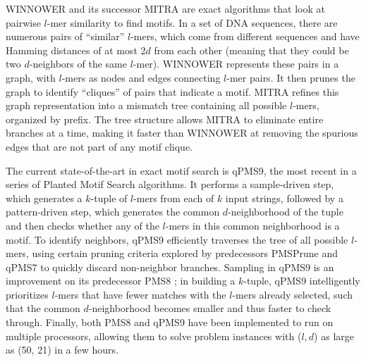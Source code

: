 \documentclass[oneside,12pt]{DISCSthesis}
\begin{document}
		WINNOWER \cite{pevzner2000combinatorial} and its successor MITRA \cite{eskin2002finding} are exact algorithms that look at pairwise $l$-mer similarity to find motifs. In a set of DNA sequences, there are numerous pairs of ``similar'' $l$-mers, which come from different sequences and have Hamming distances of at most 2$d$ from each other (meaning that they could be two $d$-neighbors of the same $l$-mer). WINNOWER represents these pairs in a graph, with $l$-mers as nodes and edges connecting $l$-mer pairs. It then prunes the graph to identify ``cliques'' of pairs that indicate a motif. MITRA refines this graph representation into a mismatch tree containing all possible $l$-mers, organized by prefix. The tree structure allows MITRA to eliminate entire branches at a time, making it faster than WINNOWER at removing the spurious edges that are not part of any motif clique.

		The current state-of-the-art in exact motif search is qPMS9, the most recent in a series \cite{pms2007,pms2014,pms2015} of Planted Motif Search algorithms. It performs a sample-driven step, which generates a $k$-tuple of $l$-mers from each of $k$ input strings, followed by a pattern-driven step, which generates the common $d$-neighborhood of the tuple and then checks whether any of the $l$-mers in this common neighborhood is a motif. To identify neighbors, qPMS9 efficiently traverses the tree of all possible $l$-mers, using certain pruning criteria explored by predecessors PMSPrune and qPMS7 \cite{pms2007} to quickly discard non-neighbor branches. Sampling in qPMS9 is an improvement on its predecessor PMS8 \cite{pms2014}; in building a $k$-tuple, qPMS9 intelligently prioritizes $l$-mers that have fewer matches with the $l$-mers already selected, such that the common $d$-neighborhood becomes smaller and thus faster to check through.  Finally, both PMS8 and qPMS9 have been implemented to run on multiple processors, allowing them to solve problem instances with ($l, d$) as large as (50, 21) in a few hours.

	\newpage
\end{document}
